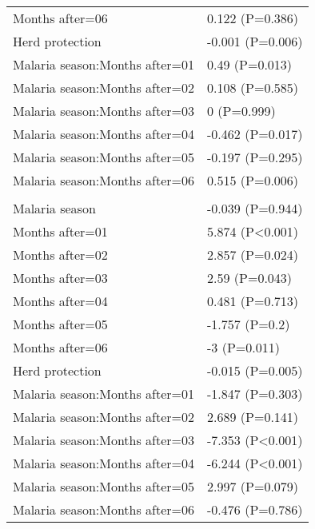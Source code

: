 \documentclass[]{article}
\begin{document}
\begin{longtable}[t]{ll}
\hspace{1em}Months after=06 & 0.122 (P=0.386)\\
\hspace{1em}Herd protection & -0.001 (P=0.006)\\
\hspace{1em}Malaria season:Months after=01 & 0.49 (P=0.013)\\
\hspace{1em}Malaria season:Months after=02 & 0.108 (P=0.585)\\
\hspace{1em}Malaria season:Months after=03 & 0 (P=0.999)\\
\hspace{1em}Malaria season:Months after=04 & -0.462 (P=0.017)\\
\hspace{1em}Malaria season:Months after=05 & -0.197 (P=0.295)\\
\hspace{1em}Malaria season:Months after=06 & 0.515 (P=0.006)\\
\addlinespace[1.5em]
\multicolumn{2}{l}{\textbf{Temporary not field worker}}\\
\hspace{1em}Malaria season & -0.039 (P=0.944)\\
\hspace{1em}Months after=01 & 5.874 (P<0.001)\\
\hspace{1em}Months after=02 & 2.857 (P=0.024)\\
\hspace{1em}Months after=03 & 2.59 (P=0.043)\\
\hspace{1em}Months after=04 & 0.481 (P=0.713)\\
\hspace{1em}Months after=05 & -1.757 (P=0.2)\\
\hspace{1em}Months after=06 & -3 (P=0.011)\\
\hspace{1em}Herd protection & -0.015 (P=0.005)\\
\hspace{1em}Malaria season:Months after=01 & -1.847 (P=0.303)\\
\hspace{1em}Malaria season:Months after=02 & 2.689 (P=0.141)\\
\hspace{1em}Malaria season:Months after=03 & -7.353 (P<0.001)\\
\hspace{1em}Malaria season:Months after=04 & -6.244 (P<0.001)\\
\hspace{1em}Malaria season:Months after=05 & 2.997 (P=0.079)\\
\hspace{1em}Malaria season:Months after=06 & -0.476 (P=0.786)\\*
\end{longtable}
\end{document}
